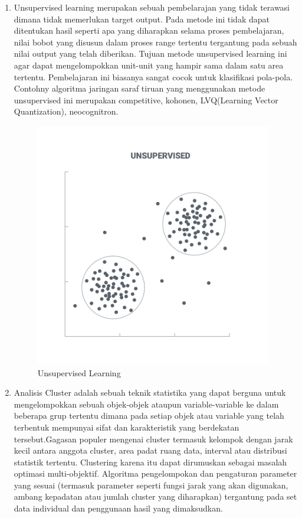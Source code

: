 \begin{enumerate}
\item Unsupervised learning merupakan sebuah pembelarajan yang tidak terawasi dimana tidak memerlukan target output. Pada metode ini tidak dapat ditentukan hasil seperti apa yang diharapkan selama proses pembelajaran, nilai bobot yang disusun dalam proses range tertentu tergantung pada sebuah nilai output yang telah diberikan. Tujuan metode unsupervised learning ini agar dapat mengelompokkan unit-unit yang hampir sama dalam satu area tertentu. Pembelajaran ini biasanya sangat cocok untuk klasifikasi pola-pola. Contohny algoritma jaringan saraf tiruan yang menggunakan metode unsupervised ini merupakan competitive, kohonen, LVQ(Learning Vector Quantization), neocognitron.
\begin{figure}[ht]
\centering
\includegraphics[scale=0.5]{figures/3mrdt.png}
\caption{Unsupervised Learning}
\label{contoh}
\end{figure}
\item Analisis Cluster adalah sebuah teknik statistika yang dapat berguna untuk mengelompokkan sebuah objek-objek ataupun variable-variable ke dalam beberapa grup tertentu dimana pada setiap objek atau variable yang telah terbentuk mempunyai sifat dan karakteristik yang berdekatan tersebut.Gagasan populer mengenai cluster termasuk kelompok dengan jarak kecil antara anggota cluster, area padat ruang data, interval atau distribusi statistik tertentu. Clustering karena itu dapat dirumuskan sebagai masalah optimasi multi-objektif. Algoritma pengelompokan dan pengaturan parameter yang sesuai (termasuk parameter seperti fungsi jarak yang akan digunakan, ambang kepadatan atau jumlah cluster yang diharapkan) tergantung pada set data individual dan penggunaan hasil yang dimaksudkan.

\end{enumerate}
